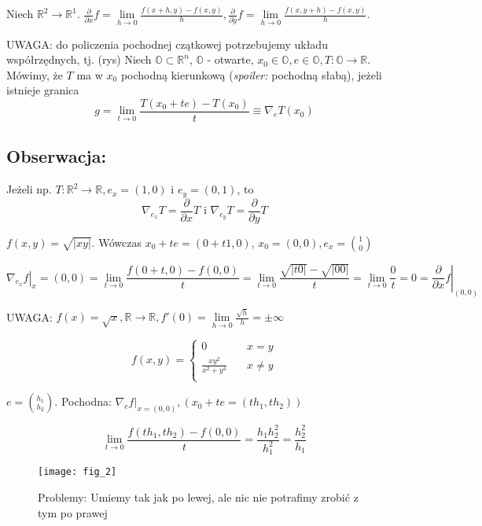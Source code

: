 \documentclass[../main.tex]{subfiles}
\begin{document}
Niech $\mathbb{R}^{2}\to\mathbb{R}^{1}$. $\frac{\partial}{\partial x} f = \lim\limits_{h \to 0}\frac{f(x+h,y) - f(x,y)}{h}, \frac{\partial}{\partial y} f = \lim\limits_{h \to 0}\frac{f(x,y+h) - f(x,y)}{h}$.\\
\vspace{0.3cm}

UWAGA: do policzenia pochodnej czątkowej potrzebujemy układu współrzędnych, tj. (rys)
\vspace{0.3cm}
Niech $\mathbb{O}\subset\mathbb{R}^{n}$, $\mathbb{O}$ - otwarte, $x_0\in\mathbb{O},e\in\mathbb{O},T:\mathbb{O}\to\mathbb{R}$.\\
Mówimy, że $T$ ma w $x_0$ pochodną kierunkową (\textit{spoiler:} pochodną słabą), jeżeli istnieje granica $$g = \lim\limits_{t \to 0}\frac{T(x_0 +te) - T(x_0)}{t} \equiv \nabla_e T(x_0)$$
\subsection{
    Obserwacja:
}
Jeżeli np. $T: \mathbb{R}^{2}\to\mathbb{R}, e_x=(1,0)$ i $e_y = (0,1)$, to $$\nabla_{e_{x}} T = \frac{\partial}{\partial x} T \text{ i } \nabla_{e_{y}} T = \frac{\partial}{\partial y} T$$

\begin{przyklad}

\end{przyklad}
$f(x,y) = \sqrt{|xy|}$. Wówczas $x_0 + te = (0+t1,0)$, $x_0 = (0,0), e_x = \binom{1}{0}$

$$\left. \nabla_{e_x} f \right |_x=(0,0) = \lim\limits_{t \to 0}\frac{f(0+t,0) - f(0,0)}{t} = \lim\limits_{t \to 0}\frac{\sqrt{|t 0|} - \sqrt{|0 0|}}{t} = \lim\limits_{t \to 0}\frac{0}{t} = 0 = \left. \frac{\partial}{\partial x} f\right |_{(0,0)}$$

UWAGA: $f(x) = \sqrt{x}, \mathbb{R}\to\mathbb{R}, f'(0) = \lim\limits_{h \to 0}\frac{\sqrt{h}}{h} = \pm \infty$

\begin{przyklad}

\end{przyklad}

\[ f(x,y) =
\begin{cases}
    0 & \quad x=y\\
    \frac{xy^2}{x^2+y^4} & \quad x \neq y\\
\end{cases}
\]

$e = \binom{h_1}{h_2}$. Pochodna: $\left. \nabla_e f\right |_{x=(0,0)}, (x_0 + te = (th_1, th_2))$

$$\lim\limits_{t \to 0}\frac{f(th_1, th_2) - f(0,0)}{t} = \frac{h_1 h_2^2}{h_1^2} = \frac{h_2^2}{h_1}$$

\begin{figure}
    \centering
    \texttt{[image: fig\_2]}
    \caption{Problemy: Umiemy tak jak po lewej, ale nic nie potrafimy zrobić z tym po prawej}
    \label{fig:fig_2}
\end{figure}
\end{document}
